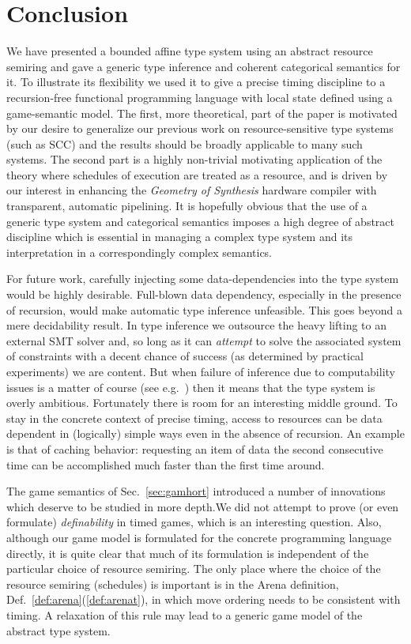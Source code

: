 \documentclass{article}
\begin{document}
\section{Conclusion}

We have presented a bounded affine type system using an abstract resource semiring and gave a generic type inference and coherent categorical semantics for it. To illustrate its flexibility we used it to give a precise timing discipline to a recursion-free functional programming language with local state defined using a game-semantic model. The first, more theoretical, part of the paper is motivated by our desire to generalize our previous work on resource-sensitive type systems (such as SCC) and the results should be broadly applicable to many such systems. The second part is a highly non-trivial motivating application of the theory where schedules of execution are treated as a resource, and is driven by our interest in enhancing the \emph{Geometry of Synthesis} hardware compiler with transparent, automatic pipelining. It is hopefully obvious that the use of a generic type system and categorical semantics imposes a high degree of abstract discipline which is essential in managing a complex type system and its interpretation in a correspondingly complex semantics.

For future work, carefully injecting some data-dependencies into the type system would be highly desirable. Full-blown data dependency, especially in the presence of recursion, would make automatic type inference unfeasible. This goes beyond a mere decidability result. In type inference we outsource the heavy lifting to an external SMT solver and, so long as it can \emph{attempt} to solve the associated system of constraints with a decent chance of success (as determined by practical experiments) we are content. But when failure of inference due to computability issues is a matter of course (see e.g.~\cite{DBLP:conf/popl/LagoP13}) then it means that the type system is overly ambitious. Fortunately there is room for an interesting middle ground. To stay in the concrete context of precise timing, access to resources can be data dependent in (logically) simple ways even in the absence of recursion. An example is that of caching behavior: requesting an item of data the second consecutive time can be accomplished much faster than the first time around. 

The game semantics of Sec.~\ref{sec:gamhort} introduced a number of innovations which deserve to be studied in more depth.We did not attempt to prove (or even formulate) \emph{definability} in timed games, which is an interesting question. Also, although our game model is formulated for the concrete programming language directly, it is quite clear that much of its formulation is independent of the particular choice of resource semiring. The only place where the choice of the resource semiring (schedules) is important is in the Arena definition, Def.~\ref{def:arena}(\ref{def:arenat}), in which move ordering needs to be consistent with timing. A relaxation of this rule may lead to a generic  game model of the abstract type system. 
\end{document}
